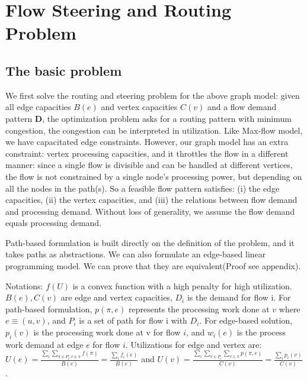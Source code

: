 \section{Flow Steering and Routing Problem}

\subsection{The basic problem}
We first solve the routing and steering problem for the above graph model: given all edge capacities $B(e)$ and vertex capacities $C(v)$ and a flow demand pattern $\mathbf{D}$, the optimization problem asks for a routing pattern with minimum congestion, the congestion can be interpreted in utilization. Like Max-flow model, we have capacitated edge constraints. However, our graph model has an extra constraint: vertex processing capacities, and it throttles the flow in a different manner: since a single flow is divisible and can be handled at different vertices, the flow is not constrained by a single node's processing power, but depending on all the nodes in the path(s). So a feasible flow pattern satisfies: (i) the edge capacities, (ii) the vertex capacities, and (iii) the relations between flow demand and processing demand. Without loss of generality, we assume the flow demand equals processing demand. 

Path-based formulation is built directly on the definition of the problem, and it takes paths as abstractions. We can also formulate an edge-based linear programming model. We can prove that they are equivalent(Proof see appendix). 

Notations: $f(U)$ is a convex function with a high penalty for high utilization. $B(e), C(v)$ are edge and vertex capacities, $D_i$ is the demand for flow i. For path-based formulation, $p(\pi,e)$ represents the processing work done at $v$ where $e\equiv(u,v)$, and $P_i$ is a set of path for flow i with $D_i$. For edge-based solution, $p_i(v)$ is the processing work done at v for flow $i$, and $w_i(e)$ is the process work demand at edge $e$ for flow $i$. 
Utilizations for edge and vertex are:
$U(e) = \frac{\sum\limits_i\sum \limits_{\pi\in P_i:e\in \pi} f(\pi)}{B(e)}=\frac{\sum\limits_{i} f_{i}(e)} {B(e)}$ and 
$U(v) = \frac{ \sum\limits_i \sum \limits_{\pi\in P_i} \sum \limits_{ e\in \pi} p(\pi, e) } {C(v)}=\frac{ \sum\limits_i p_i(v)}{C(v)}$.

